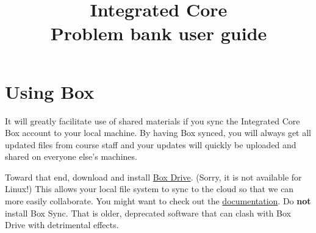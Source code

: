 % 

\usepackage{pdfpages}

\author{}
\title{\textsf{Integrated Core\\Problem bank user guide}}


\maketitle

\setcounter{section}{0}
\setcounter{problem}{0}
\setcounter{solution}{0}

\reversemarginpar
\marginparsep  0.1in
\marginparwidth 0.7in


\section{Using Box}

It will greatly facilitate use of shared materials if you sync the Integrated Core Box account to your local machine. By having Box synced, you will always get all updated files from course staff and your updates will quickly be uploaded and shared on everyone else's machines.

Toward that end, download and install \href{https://www.box.com/resources/downloads}{Box Drive}. (Sorry, it is not available for Linux!) This allows your local file system to sync to the cloud so that we can more easily collaborate. You might want to check out the \href{https://support.box.com/hc/en-us/articles/360043697494-Using-Box-Drive-Basics}{documentation}. Do \textbf{not} install Box Sync. That is older, deprecated software that can clash with Box Drive with detrimental effects.

